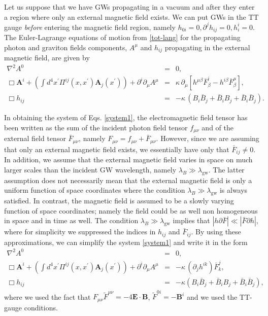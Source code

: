 \documentclass[a4paper,11pt]{article}
\newcommand{\bs}{\boldsymbol}
\begin{document}
Let us suppose that we have GWs propagating in a vacuum and after they enter a region where only an external magnetic field exists. We can put GWs in the TT gauge \emph{before} entering the magnetic field region, namely $h_{0i}=0, \partial^j h_{ij}=0,h_i^i=0$. The Euler-Lagrange equations of motion from \eqref{tot-lang} for the propagating photon and graviton fields components, $A^\mu$ and $h_{ij}$ propagating in the external magnetic field, are given by 
\begin{eqnarray}
\nabla^2 A^0 &=& 0,\nonumber\\ 
\Box \bs A^i +\left(\int d^4x^\prime \Pi^{i j}(x, x^\prime)\bs A_j(x^\prime)\right)+ \partial^i\partial_\mu A^\mu &=& \kappa\,\partial_\mu[h^{\mu\beta}\bar {F}_{\beta}^{i}-h^{i\beta}\bar {F}_{\beta}^{\mu}],\nonumber\\
\Box h_{ij} &=&-\kappa\, (B_i\bar B_j+\bar B_i B_j +\bar B_i\bar B_j).
 \label{system1}
\end{eqnarray}

In obtaining the system of Eqs. \eqref{system1}, the electromagnetic field tensor has been written as the sum of the incident photon field tensor $f_{\mu\nu}$ and of the external field tensor $\bar F_{\mu\nu}$, namely $F_{\mu\nu}=f_{\mu\nu}+\bar F_{\mu\nu}$. However, since we are assuming that only an external magnetic field exists, we essentially have only that $\bar F_{ij}\neq 0$. In addition, we assume that the external magnetic field varies in space on much larger scales than the incident GW wavelength, namely $\lambda_B\gg \lambda_\text{gw}$. The latter assumption does not necessarily mean that the external magnetic field is only a uniform function of space coordinates where the condition $\lambda_B\gg \lambda_\text{gw}$ is always satisfied. In contrast, the magnetic field is assumed to be a slowly varying function of space coordinates;  namely the field could be as well non homogeneous in space and in time as well. The condition $\lambda_B\gg \lambda_\text{gw}$ implies that $|h\partial \bar F|\ll |\bar F \partial h|$, where for simplicity we suppressed the indices in $h_{ij}$ and $\bar F_{ij}$. By using these approximations, we can simplify the system \eqref{system1} and write it in the form
\begin{eqnarray}
\nabla^2 A^0 &=& 0 ,\nonumber\\
 \Box \bs A^i +\left(\int d^4x^\prime \Pi^{i j}(x, x^\prime)\bs A_j(x^\prime)\right)+ \partial^i\partial_\mu A^\mu &=&  - \kappa\,(\partial_j h^{ik})\bar F_{k}^j,\nonumber\\
\Box h_{ij} &=&-\kappa\left(B_i\bar B_j+\bar B_i B_j +\bar B_i\bar B_j \right), 
  \label{system2}
\end{eqnarray}
where we used the fact that $F_{\mu\nu}\tilde F^{\mu\nu}=-4 \bs E\cdot \bs B$, $\tilde F^{0i}=-\bs B^i$ and we used the TT-gauge conditions. 
\end{document}
